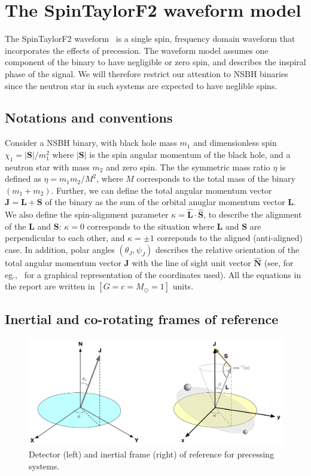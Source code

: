 \chapter{The SpinTaylorF2 waveform model} 

\label{chap:SpinTaylorF2} 
The SpinTaylorF2 waveform~\cite{Lundgren2014} is a single spin, frequency
domain waveform that incorporates the effects of precession.  The waveform
model assumes one component of the binary to have negligible or zero spin, and
describes the inspiral phase of the signal. We will therefore
restrict our attention to NSBH binaries since the neutron star in such
systems are expected to have neglible spins.

\section{Notations and conventions}
Consider a NSBH binary, with black hole mass $m_{1}$ and dimensionless spin
$\chi_{1} = |\mathbf{S}|/m_{1}^2$ where $|\mathbf{S}|$ is the spin angular
momentum of the black hole, and a neutron star with mass $m_{2}$ and zero
spin. The the symmetric mass ratio $\eta$ is defined as $\eta=m_{1}m_{2}/M^2$,
where $M$ corresponds to the total mass of the binary $(m_{1} + m_{2})$.
Further, we can define the total angular momentum vector
$\mathbf{J}=\mathbf{L} + \mathbf{S}$ of the binary as the sum of the orbital
anuglar momentum vector $\mathbf{L}$. We also define the spin-alignment parameter
$\kappa=\hat{\mathbf{L}}\cdot\hat{\mathbf{S}}$, to describe the alignment of
the $\mathbf{L}$ and $\mathbf{S}$: $\kappa=0$ corresponds to the situation
where $\mathbf{L}$ and $\mathbf{S}$ are perpendicular to each other, and
$\kappa=\pm 1$ correponds to the aligned (anti-aligned) case. In addition,
polar angles $(\theta_{J}, \psi_{J})$  describes the relative orientation  of
the total angular momentum vector $\mathbf{J}$ with the line of sight unit
vector $\hat{\mathbf{N}}$ (see, for eg.,~\cite{thetaJ} for a graphical
representation of the coordinates used). All the equations in the report are
written in $\left[G = c = M_{\odot }= 1\right]$ units.

\section{Inertial and co-rotating frames of reference}

\label{fig:frames} 
\begin{figure}[t]
\includegraphics[width=\textwidth]{./images/STF2_coordinates.pdf}
\caption{Detector (left) and inertial frame (right) of reference for
precessing systems.}
\centering 
\end{figure}

